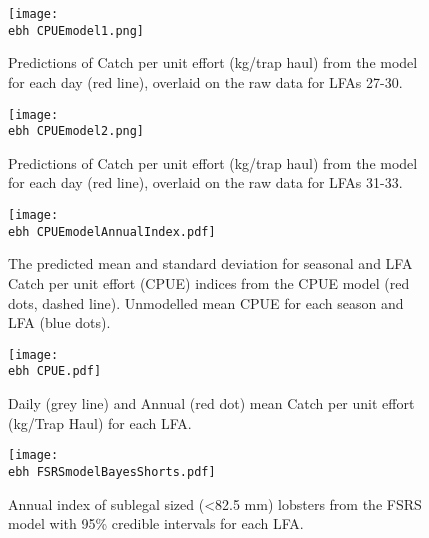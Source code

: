 \documentclass[11pt]{article}
\newcommand{\ebh}{/SpinDr/backup/bio_data/bio.lobster/figures/LFA2733Framework2018/} %
\begin{document}

    \begin{figure}
    \centering
        \texttt{[image: \\ebh CPUEmodel1.png]}
        \caption{Predictions of Catch per unit effort (kg/trap haul) from the model for each day (red line), overlaid on the raw data for LFAs 27-30. }

    \end{figure}


    \begin{figure}
    \centering
        \texttt{[image: \\ebh CPUEmodel2.png]}
        \caption{Predictions of Catch per unit effort (kg/trap haul) from the model for each day (red line), overlaid on the raw data for LFAs 31-33.}

    \end{figure}

    \begin{figure}
    \centering
        \texttt{[image: \\ebh CPUEmodelAnnualIndex.pdf]}
        \caption{The predicted mean and standard deviation for seasonal and LFA Catch per unit effort (CPUE) indices from the CPUE model (red dots, dashed line). Unmodelled mean CPUE for each season and LFA (blue dots).}

    \end{figure}


    \begin{figure}
    \centering
        \texttt{[image: \\ebh CPUE.pdf]}
        \caption{Daily (grey line) and Annual (red dot) mean Catch per unit effort (kg/Trap Haul) for each LFA.}

    \end{figure}




    \begin{figure}
    \centering
        \texttt{[image: \\ebh FSRSmodelBayesShorts.pdf]}
        \caption{Annual index of sublegal sized (\textless 82.5 mm) lobsters from the FSRS model with 95\% credible intervals for each LFA.}

    \end{figure}
\end{document}

